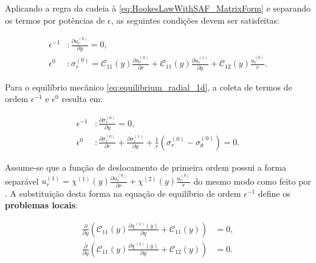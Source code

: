 
Aplicando a regra da cadeia à \eqref{eq:HookesLawWithSAF_MatrixForm} e separando os termos por potências de $\epsilon$, as seguintes condições devem ser satisfeitas: 

\begin{equation}
  \begin{aligned}
    \epsilon^{-1} &: \frac{\partial u_r^{(0)}}{\partial y} = 0, \\
    \epsilon^0 &: \sigma_r^{(0)} = \mathcal{C}_{11}(y) \frac{\partial u_r^{(0)}}{\partial r} + \mathcal{C}_{11}(y) \frac{\partial u_r^{(1)}}{\partial y} + \mathcal{C}_{12}(y) \frac{u_r^{(0)}}{r}.
  \end{aligned}
  \label{eq:HookesLawWithSAFRdirection}
\end{equation}

Para o equilíbrio mecânico \eqref{eq:equilibrium_radial_1d}, a coleta de termos de ordem $\epsilon^{-1}$ e $\epsilon^0$ resulta em:

\begin{equation}
  \begin{aligned}
    \epsilon^{-1} &: \frac{\partial \sigma_r^{(0)}}{\partial y} = 0, \\
    \epsilon^0 &: \frac{\partial \sigma_r^{(0)}}{\partial r} + \frac{\partial \sigma_r^{(1)}}{\partial y} + \frac{1}{r} (\sigma_r^{(0)} - \sigma_\theta^{(0)}) = 0.
  \end{aligned}
  \label{eq:EquilibriumWithStressSAFs}
\end{equation}

Assume-se que a função de deslocamento de primeira ordem possui a forma separável $u_r^{(1)} = \chi^{(1)}(y) \frac{\partial u_r^{(0)}}{\partial r} + \chi^{(2)}(y) \frac{u_r^{(0)}}{r}$ do mesmo modo como feito por \cite{BrunaReport}. A substituição desta forma na equação de equilíbrio de ordem $\epsilon^{-1}$ define os \textbf{problemas locais}:

\begin{equation}
  \begin{aligned}
    \frac{\partial}{\partial y} \left( \mathcal{C}_{11}(y) \frac{\partial \chi^{(1)}(y)}{\partial y} + \mathcal{C}_{11}(y) \right) &= 0, \\
    \frac{\partial}{\partial y} \left( \mathcal{C}_{11}(y) \frac{\partial \chi^{(2)}(y)}{\partial y} + \mathcal{C}_{12}(y) \right) &= 0.
  \end{aligned}
  \label{eq:LocalProblems}
\end{equation}

